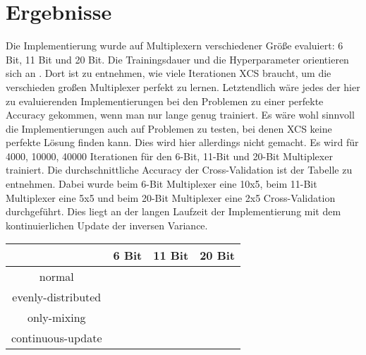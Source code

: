 \documentclass{ocsmnar}
\begin{document}
\section{Ergebnisse}
Die Implementierung wurde auf Multiplexern verschiedener Größe evaluiert: 6 Bit, 11 Bit und 20 Bit. Die Trainingsdauer und die Hyperparameter orientieren sich an \cite{iqbal13}. Dort ist zu entnehmen, wie viele Iterationen XCS braucht, um die verschieden großen Multiplexer perfekt zu lernen. Letztendlich wäre jedes der hier zu evaluierenden Implementierungen bei den Problemen zu einer perfekte Accuracy gekommen, wenn man nur lange genug trainiert. Es wäre wohl sinnvoll die Implementierungen auch auf Problemen zu testen, bei denen XCS keine perfekte Lösung finden kann. Dies wird hier allerdings nicht gemacht. 
Es wird für 4000, 10000, 40000 Iterationen für den 6-Bit, 11-Bit und 20-Bit Multiplexer trainiert. 
Die durchschnittliche Accuracy der Cross-Validation ist der Tabelle %
 zu entnehmen. Dabei wurde beim 6-Bit Multiplexer eine 10x5, beim 11-Bit Multiplexer eine 5x5 und beim 20-Bit Multiplexer eine 2x5 Cross-Validation durchgeführt. Dies liegt an der langen Laufzeit der Implementierung mit dem kontinuierlichen Update der inversen Variance. 

\begin{center}
\begin{tabular}{|c|c|c|c|}
    \hline
    & 6 Bit & 11 Bit & 20 Bit \\
    \hline
    normal & & & \\
    \hline
    evenly-distributed & & &\\
    \hline
    only-mixing & & & \\
    \hline
    continuous-update & & & \\
    \hline
\end{tabular}
\end{center}
\end{document}
